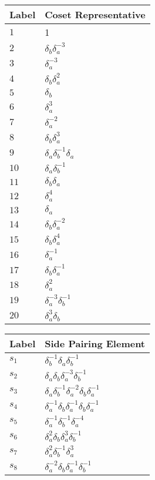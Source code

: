 \documentclass{article}
\begin{document}
\begin{center}
\begin{tabular}{ll}
\toprule
Label & Coset Representative\\
\midrule
$1$ & 1 \\
$2$ & $\delta_b^{}\delta_a^{-3}$ \\
$3$ & $\delta_a^{-3}$ \\
$4$ & $\delta_b^{}\delta_a^{2}$ \\
$5$ & $\delta_b^{}$ \\
$6$ & $\delta_a^{3}$ \\
$7$ & $\delta_a^{-2}$ \\
$8$ & $\delta_b^{}\delta_a^{3}$ \\
$9$ & $\delta_a^{}\delta_b^{-1}\delta_a^{}$ \\
$10$ & $\delta_a^{}\delta_b^{-1}$ \\
$11$ & $\delta_b^{}\delta_a^{}$ \\
$12$ & $\delta_a^{4}$ \\
$13$ & $\delta_a^{}$ \\
$14$ & $\delta_b^{}\delta_a^{-2}$ \\
$15$ & $\delta_b^{}\delta_a^{4}$ \\
$16$ & $\delta_a^{-1}$ \\
$17$ & $\delta_b^{}\delta_a^{-1}$ \\
$18$ & $\delta_a^{2}$ \\
$19$ & $\delta_a^{-3}\delta_b^{-1}$ \\
$20$ & $\delta_a^{3}\delta_b^{}$ \\
\bottomrule
\end{tabular}
\hfill
\begin{tabular}{ll}
\toprule
Label & Side Pairing Element\\
\midrule
$s_{1}$ & $\delta_b^{-1}\delta_a^{}\delta_b^{-1}$ \\
$s_{2}$ & $\delta_a^{}\delta_b^{}\delta_a^{-3}\delta_b^{-1}$ \\
$s_{3}$ & $\delta_a^{}\delta_b^{-1}\delta_a^{-2}\delta_b^{}\delta_a^{-1}$ \\
$s_{4}$ & $\delta_a^{-1}\delta_b^{}\delta_a^{-1}\delta_b^{}\delta_a^{-1}$ \\
$s_{5}$ & $\delta_a^{-1}\delta_b^{-1}\delta_a^{-4}$ \\
$s_{6}$ & $\delta_a^{2}\delta_b^{}\delta_a^{3}\delta_b^{-1}$ \\
$s_{7}$ & $\delta_a^{2}\delta_b^{-1}\delta_a^{3}$ \\
$s_{8}$ & $\delta_a^{-2}\delta_b^{}\delta_a^{-1}\delta_b^{-1}$ \\

\end{tabular}
\end{center}
\end{document}
